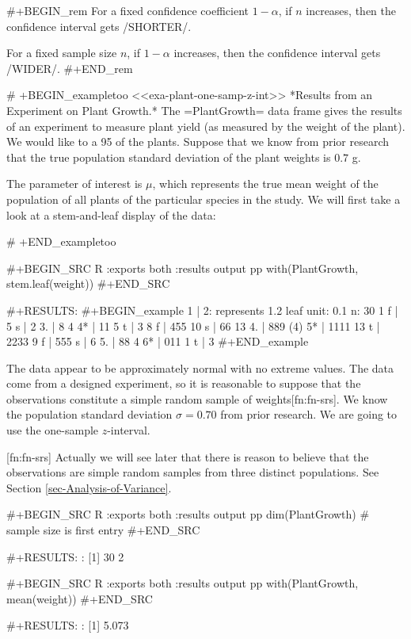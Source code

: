 #+BEGIN_rem
For a fixed confidence coefficient \(1-\alpha\), if \(n\) increases,
then the confidence interval gets /SHORTER/.

For a fixed sample size \(n\), if \(1-\alpha\) increases, then the
confidence interval gets /WIDER/.
#+END_rem

# +BEGIN_exampletoo
<<exa-plant-one-samp-z-int>> *Results from an Experiment on Plant
Growth.* The =PlantGrowth= data frame gives the results of an
experiment to measure plant yield (as measured by the weight of the
plant). We would like to a 95%
of the plants. Suppose that we know from prior research that the true
population standard deviation of the plant weights is \(0.7\) g.

The parameter of interest is \(\mu\), which represents the true mean
weight of the population of all plants of the particular species in
the study. We will first take a look at a stem-and-leaf display of the
data:

# +END_exampletoo


#+BEGIN_SRC R :exports both :results output pp 
with(PlantGrowth, stem.leaf(weight))
#+END_SRC

#+RESULTS:
#+BEGIN_example
1 | 2: represents 1.2
 leaf unit: 0.1
            n: 30
   1     f | 5
         s | 
   2    3. | 8
   4    4* | 11
   5     t | 3
   8     f | 455
  10     s | 66
  13    4. | 889
  (4)   5* | 1111
  13     t | 2233
   9     f | 555
         s | 
   6    5. | 88
   4    6* | 011
   1     t | 3
#+END_example

The data appear to be approximately normal with no extreme values. The
data come from a designed experiment, so it is reasonable to suppose
that the observations constitute a simple random sample of
weights[fn:fn-srs]. We know the population standard deviation
\(\sigma=0.70\) from prior research. We are going to use the
one-sample \(z\)-interval.

[fn:fn-srs] Actually we will see later that there is reason to believe
that the observations are simple random samples from three distinct
populations. See Section \ref{sec-Analysis-of-Variance}.

#+BEGIN_SRC R :exports both :results output pp 
dim(PlantGrowth)   # sample size is first entry
#+END_SRC

#+RESULTS:
: [1] 30  2

#+BEGIN_SRC R :exports both :results output pp 
with(PlantGrowth, mean(weight))
#+END_SRC

#+RESULTS:
: [1] 5.073

